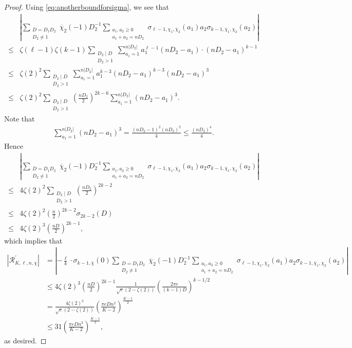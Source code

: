 \documentclass[11pt,letterpaper,reqno]{amsart}
\numberwithin{figure}{section}
\numberwithin{table}{section}
\theoremstyle{definition}
\theoremstyle{plain}
\theoremstyle{definition}
\theoremstyle{definition}
\theoremstyle{remark}
\numberwithin{equation}{section}
\theoremstyle{remark}
\begin{document}
\begin{proof}Using \eqref{eq:anotherboundforsigma}, we see that
    \begin{align*}
       &\left|\sum\limits_{\substack{D=D_1D_2\\D_2\neq 1}}\overline{\chi}_2(-1)D_2^{-1}\sum\limits_{\substack{a_1,a_2\geq0\\a_1+a_2=nD_2}}\sigma_{\ell-1,\chi_1,\overline{\chi}_{2}}(a_1)a_2\sigma_{k-1,\overline{\chi}_{1},\chi_2}(a_2)\right|\\\leq&\zeta(\ell-1)\zeta(k-1)\sum_{\substack{D_2\mid D\\D_2>1}}\sum_{a_1=1}^{n|D_2|}a_1^{\ell-1}(nD_2-a_1)\cdot(nD_2-a_1)^{k-1}\\\leq&\zeta(2)^2\sum_{\substack{D_2\mid D\\D_2>1}}\sum_{a_1=1}^{n|D_2|}a_1^{k-3}(nD_2-a_1)^{k-3}(nD_2-a_1)^3\\\leq&\zeta(2)^2\sum_{\substack{D_2\mid D\\D_2>1}}\left(\frac{nD_2}{2}\right)^{2k-6}\sum_{a_1=1}^{n|D_2|}(nD_2-a_1)^3.
    \end{align*}
    Note that 
    \begin{align*}
      \sum_{a_1=1}^{n|D_2|}(nD_2-a_1)^3=\frac{(nD_2-1)^2(nD_2)^2}{4}\leq\frac{(nD_2)^4}{4}.
    \end{align*}
Hence
\begin{align*}
    &\left|\sum\limits_{\substack{D=D_1D_2\\D_2\neq 1}}\overline{\chi}_2(-1)D_2^{-1}\sum\limits_{\substack{a_1,a_2\geq0\\a_1+a_2=nD_2}}\sigma_{\ell-1,\chi_1,\overline{\chi}_{2}}(a_1)a_2\sigma_{k-1,\overline{\chi}_{1},\chi_2}(a_2)\right|\\\leq&4\zeta(2)^2\sum_{\substack{D_2\mid D\\D_2>1}}\left(\frac{nD_2}{2}\right)^{2k-2}\\\leq&4\zeta(2)^2\left(\frac{n}{2}\right)^{2k-2}\sigma_{2k-2}(D)\\\leq&4\zeta(2)^3\left(\frac{nD}{2}\right)^{2k-1},
\end{align*}
which implies that
    \begin{align*}
        |\mathscr{R}^{\prime}_{K,\ell,n,\chi}|&=\left|-\frac{\ell}{k}\cdot\sigma_{k-1,\overline{\chi}}(0)\sum\limits_{\substack{D=D_1D_2\\D_2\neq 1}}\overline{\chi}_2(-1)D_2^{-1}\sum\limits_{\substack{a_1,a_2\geq0\\a_1+a_2=nD_2}}\sigma_{\ell-1,\chi_1,\overline{\chi}_{2}}(a_1)a_2\sigma_{k-1,\overline{\chi}_{1},\chi_2}(a_2)\right|\\&\leq4\zeta(2)^3\left(\frac{nD}{2}\right)^{2k-1}\frac{1}{\sqrt{e}(2-\zeta(2))}\left(\frac{2\pi e}{(k-1)D}\right)^{k-1/2}\\&=\frac{4\zeta(2)^3}{\sqrt{e}(2-\zeta(2))}\left(\frac{\pi eDn^2}{K-2}\right)^{\frac{K-1}{2}}\\&\leq31\left(\frac{\pi eDn^2}{K-2}\right)^{\frac{K-1}{2}},
    \end{align*}
    as desired.
\end{proof}
\end{document}
